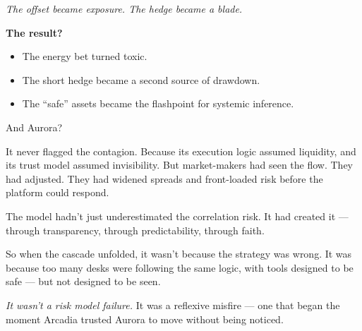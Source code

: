 \textit{The offset became exposure. The hedge became a blade.}

\textbf{The result?}

\begin{itemize}
  \item The energy bet turned toxic.  
  \item The short hedge became a second source of drawdown.  
  \item The “safe” assets became the flashpoint for systemic inference.
\end{itemize}

And Aurora?

It never flagged the contagion.  
Because its execution logic assumed liquidity, and its trust model assumed invisibility.  
But market-makers had seen the flow.  
They had adjusted.  
They had widened spreads and front-loaded risk before the platform could respond.

The model hadn’t just underestimated the correlation risk.  
It had created it — through transparency, through predictability, through faith.

So when the cascade unfolded, it wasn’t because the strategy was wrong.  
It was because too many desks were following the same logic,  
with tools designed to be safe — but not designed to be seen.

\textit{It wasn’t a risk model failure.}  
It was a reflexive misfire — one that began the moment Arcadia trusted Aurora to move without being noticed.


\medskip

